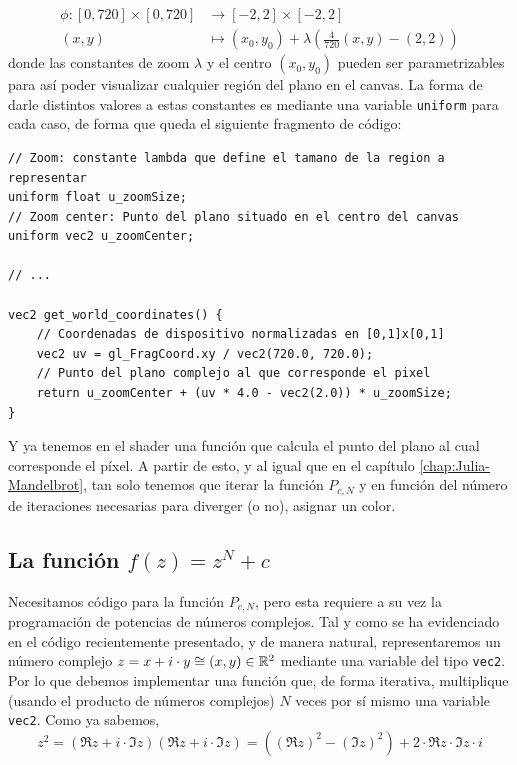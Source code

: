 \begin{equation}
    \label{eq:transformacion-lineal-3}
    \begin{split}
        \phi:[0,720]\times[0,720] & \longrightarrow [-2,2]\times[-2,2] \\
        (x,y) & \longmapsto (x_0,y_0) + \lambda\left(\frac{4}{720}(x,y)-(2,2)\right)
    \end{split}
\end{equation}
donde las constantes de zoom $\lambda$ y el centro $(x_0,y_0)$ pueden ser parametrizables para así poder visualizar cualquier región del plano en el canvas. La forma de darle distintos valores a estas constantes es mediante una variable \verb|uniform| para cada caso, de forma que queda el siguiente fragmento de código:

\begin{lstlisting}
// Zoom: constante lambda que define el tamano de la region a representar
uniform float u_zoomSize;
// Zoom center: Punto del plano situado en el centro del canvas
uniform vec2 u_zoomCenter;

// ... 

vec2 get_world_coordinates() {
    // Coordenadas de dispositivo normalizadas en [0,1]x[0,1]
    vec2 uv = gl_FragCoord.xy / vec2(720.0, 720.0);
    // Punto del plano complejo al que corresponde el pixel
    return u_zoomCenter + (uv * 4.0 - vec2(2.0)) * u_zoomSize;
}
\end{lstlisting}

Y ya tenemos en el shader una función que calcula el punto del plano al cual corresponde el píxel. A partir de esto, y al igual que en el capítulo \ref{chap:Julia-Mandelbrot}, tan solo tenemos que iterar la función $P_{c,N}$ y en función del número de iteraciones necesarias para diverger (o no), asignar un color.

\subsection{La función $f(z)=z^N+c$}

Necesitamos código para la función $P_{c,N}$, pero esta requiere a su vez la programación de potencias de números complejos. Tal y como se ha evidenciado en el código recientemente presentado, y de manera natural, representaremos un número complejo $z=x+i\cdot y\cong (x,y)\in\mathbb{R}^2$ mediante una variable del tipo \verb|vec2|. Por lo que debemos implementar una función que, de forma iterativa, multiplique (usando el producto de números complejos) $N$ veces por sí mismo una variable \verb|vec2|. Como ya sabemos,
$$
z^2 = (\Re z+i\cdot \Im z)(\Re z+i\cdot \Im z) = ((\Re z)^2-(\Im z)^2) + 2\cdot\Re z\cdot\Im z\cdot i
$$


